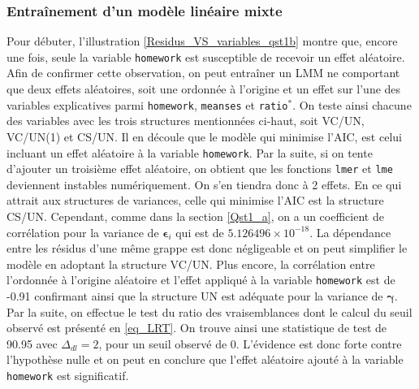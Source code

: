 \documentclass{article}
\begin{document}
	\subsubsection*{Entraînement d'un modèle linéaire mixte} 
		Pour débuter,  l'illustration \ref{Residus_VS_variables_qst1b}
		montre que, encore une fois, seule la variable \texttt{homework} est susceptible de recevoir un effet aléatoire. Afin de confirmer cette observation, on peut entraîner un LMM ne comportant que deux effets aléatoires, soit une ordonnée à l'origine et un effet sur l'une des variables explicatives parmi \texttt{homework}, \texttt{meanses} et \texttt{ratio}$^*$.
		On teste ainsi chacune des variables avec les trois structures mentionnées ci-haut, soit VC/UN, VC/UN(1) et CS/UN. Il en découle que le modèle qui minimise l'AIC, est celui incluant un effet aléatoire à la variable \texttt{homework}. Par la suite, si on tente d'ajouter un troisième effet aléatoire, on obtient que les fonctions \texttt{lmer} et \texttt{lme} deviennent instables numériquement. On s'en tiendra donc à 2 effets. En ce qui attrait aux structures de variances, celle qui minimise l'AIC est la structure CS/UN. Cependant, comme dans la section \ref{Qst1_a}, on a un coefficient de corrélation pour la variance de $\boldsymbol{\epsilon}_i$ qui est de $5.126496\times 10^{-18}$. La dépendance entre les résidus d'une même grappe est donc négligeable et on peut simplifier le modèle en adoptant la structure VC/UN. Plus encore, la corrélation entre l'ordonnée à l'origine aléatoire et l'effet appliqué à la variable \texttt{homework} est de -0.91 confirmant ainsi que la structure UN est adéquate pour la variance de $\boldsymbol{\gamma}$.\\
		
		Par la suite, on effectue le test du ratio des vraisemblances dont le calcul du seuil observé est présenté en \eqref{eq_LRT}. On trouve ainsi une statistique de test de 90.95 avec $\Delta_{dl}=2$, pour un seuil observé de 0. L'évidence est donc forte contre l'hypothèse nulle et on peut en conclure que l'effet aléatoire ajouté à la variable \texttt{homework} est significatif.\\
		
\end{document}
